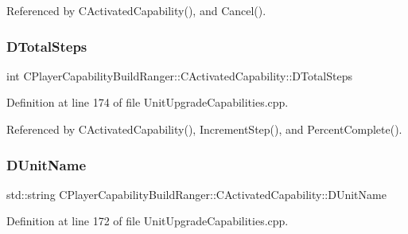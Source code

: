 Referenced by C\+Activated\+Capability(), and Cancel().

\hypertarget{classCPlayerCapabilityBuildRanger_1_1CActivatedCapability_a322dd429ae588ed82febdcf459232bee}{}\label{classCPlayerCapabilityBuildRanger_1_1CActivatedCapability_a322dd429ae588ed82febdcf459232bee} 
\subsubsection{\texorpdfstring{D\+Total\+Steps}{DTotalSteps}}
{\footnotesize\ttfamily int C\+Player\+Capability\+Build\+Ranger\+::\+C\+Activated\+Capability\+::\+D\+Total\+Steps\hspace{0.3cm}{\ttfamily [protected]}}



Definition at line 174 of file Unit\+Upgrade\+Capabilities.\+cpp.



Referenced by C\+Activated\+Capability(), Increment\+Step(), and Percent\+Complete().

\hypertarget{classCPlayerCapabilityBuildRanger_1_1CActivatedCapability_a0914856622c9b77b9943add2491c97be}{}\label{classCPlayerCapabilityBuildRanger_1_1CActivatedCapability_a0914856622c9b77b9943add2491c97be} 
\subsubsection{\texorpdfstring{D\+Unit\+Name}{DUnitName}}
{\footnotesize\ttfamily std\+::string C\+Player\+Capability\+Build\+Ranger\+::\+C\+Activated\+Capability\+::\+D\+Unit\+Name\hspace{0.3cm}{\ttfamily [protected]}}



Definition at line 172 of file Unit\+Upgrade\+Capabilities.\+cpp.



